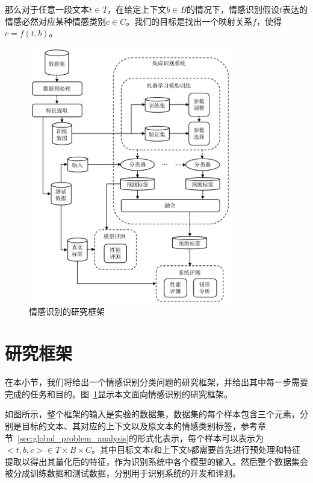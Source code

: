 那么对于任意一段文本$t \in T$，在给定上下文$b \in B$的情况下，情感识别假设$t$表达的情感必然对应某种情感类别$c \in C$。我们的目标是找出一个映射关系$f$，使得 $c=f(t, b)$。

\begin{figure}[H]
  \centering
  \includegraphics[width=0.8\textwidth]{img/framework_v2.pdf}
  \caption{情感识别的研究框架}
  \label{fig:framework}
\end{figure}

\section{研究框架}
\label{sec:global_framework}

在本小节，我们将给出一个情感识别分类问题的研究框架，并给出其中每一步需要完成的任务和目的。图~\ref{fig:framework}显示本文面向情感识别的研究框架。

如图所示，整个框架的输入是实验的数据集，数据集的每个样本包含三个元素，分别是目标的文本、其对应的上下文以及原文本的情感类别标签，参考章节~\ref{sec:global_problem_analysis}的形式化表示，每个样本可以表示为 $<t, b, c> \in T \times B \times C$。其中目标文本$t$和上下文$b$都需要首先进行预处理和特征提取以得出其量化后的特征，作为识别系统中各个模型的输入。然后整个数据集会被分成训练数据和测试数据，分别用于识别系统的开发和评测。

